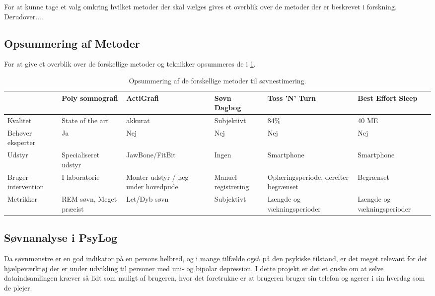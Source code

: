 For at kunne tage et valg omkring hvilket metoder der skal vælges gives et overblik over de metoder der er beskrevet i forskning. Derudover....


\subsection{Opsummering af Metoder}
For at give et overblik over de forskellige metoder og teknikker opsummeres de i \cref{tab:opsummeringMetoder}.

\begin{table}[h]
\begin{tabular}{|p{1.5cm}|p{2cm}|p{3cm}|p{2cm}|p{3cm}|p{2cm}|}
\hline                    	& Poly somnografi      		& ActiGrafi                           & Søvn Dagbog          & Toss 'N' Turn                        & Best Effort Sleep \\ 
\hline Kvalitet           	& State of the art			& akkurat                & Subjektivt           & 84\%   		& 40 ME \\ 
\hline Behøver eksperter   	& Ja						& Nej                                 & Nej                  & Nej    		& Nej \\ 
\hline Udstyr              	& Specialiseret udstyr		& JawBone/FitBit                      & Ingen                  & Smartphone   & Smartphone \\ 
\hline Bruger intervention 	& I laboratorie	& Monter udstyr / læg under hovedpude & Manuel registrering  & Oplæringsperiode, derefter begrænset & Begrænset \\ 
\hline Metrikker           	& REM søvn, Meget præcist	& Let/Dyb søvn                        & Subjektivt           & Længde og vækningsperioder & Længde og vækningsperioder \\ 
\hline 
\end{tabular}
\caption{Opsummering af de forskellige metoder til søvnestimering.}
\label{tab:opsummeringMetoder}
\end{table}

\subsection{Søvnanalyse i PsyLog}
Da søvnmønstre er en god indikator på en persons helbred, og i mange tilfælde også på den psykiske tilstand, er det meget relevant for det hjælpeværktøj der er under udvikling til personer med uni- og bipolar depression.
I dette projekt er der et ønske om at selve dataindsamlingen kræver så lidt som muligt af brugeren, hvor det foretrukne er at brugeren bruger sin telefon og agerer i sin hverdag som de plejer.

